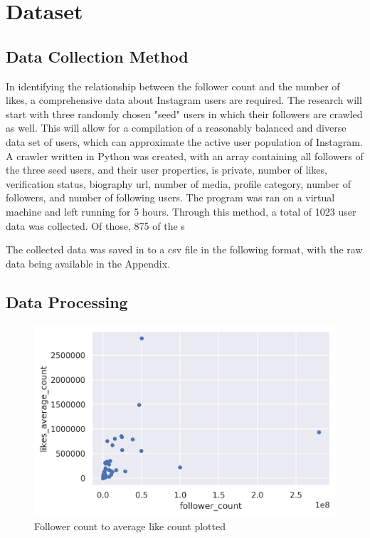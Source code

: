 \documentclass[11pt]{article}
\begin{document}
\section{Dataset}\label{section-dataset}

\subsection{Data Collection Method}

\quad\quad In identifying the relationship between the follower count and the number of likes, a comprehensive data about Instagram users are required. The research will start with three randomly chosen "seed" users in which their followers are crawled as well. This will allow for a compilation of a reasonably balanced and diverse data set of users, which can approximate the active user population of Instagram. A crawler written in Python was created, with an array containing all followers of the three seed users, and their user properties, is private, number of likes, verification status, biography url, number of media, profile category, number of followers, and number of following users. The program was ran on a virtual machine and left running for 5 hours. Through this method, a total of 1023 user data was collected. Of those, 875 of the s

The collected data was saved in to a csv file in the following format, with the raw data being available in the Appendix.

\subsection{Data Processing}
\begin{figure}[h!]
  \center
  \includegraphics[width=0.75\linewidth]{images/row_data_graph.png}
  \caption{Follower count to average like count plotted}
  \label{fig:raw_data}
\end{figure}
\end{document}
